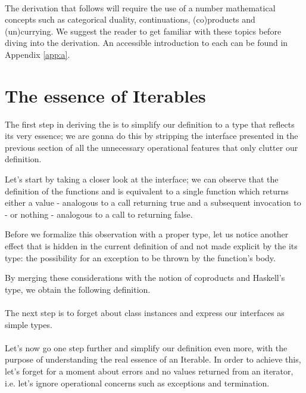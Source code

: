 \\

The derivation that follows will require the use of a number mathematical concepts such as categorical duality, continuations, (co)products and (un)currying. We suggest the reader to get familiar with these topics before diving into the derivation. An accessible introduction to each can be found in Appendix \ref{app:a}.

\section{The essence of Iterables}

The first step in deriving the  is to simplify our  definition to a type that reflects its very essence; we are gonna do this by stripping the interface presented in the previous section of all the unnecessary operational features that only clutter our definition.

Let's start by taking a closer look at the  interface; we can observe that the definition of the functions  and  is equivalent to a single function which returns either a value - analogous to a  call returning true and a subsequent invocation to  - or nothing - analogous to a call to  returning false. 

Before we formalize this observation with a proper type, let us notice another effect that is hidden in the current definition of  and not made explicit by the its type: the possibility for an exception to be thrown by the function's body. 

By merging these considerations with the notion of coproducts and Haskell's  type, we obtain the following definition.\\

\\

The next step is to forget about class instances and express our interfaces as simple types.\\

\\

Let's now go one step further and simplify our definition even more, with the purpose of understanding the real essence of an Iterable. In order to achieve this, let's forget for a moment about errors and no values returned from an iterator, i.e. let's ignore operational concerns such as exceptions and termination.\\

